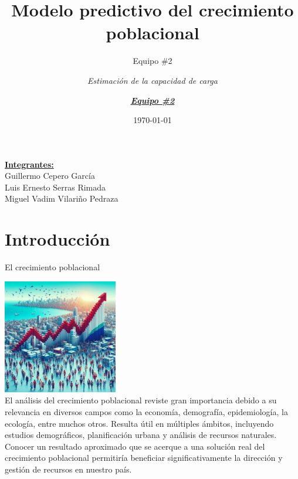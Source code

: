 \documentclass{beamer}
\title{Modelo predictivo del crecimiento poblacional}
\subtitle{Equipo \#2}
\author{\textit{Estimación de la capacidad de carga }}
\date{\today}
\begin{document}

\begin{frame}
    \titlepage 
    \underline{\textbf{Integrantes: }}\\
    Guillermo Cepero García \\ Luis Ernesto Serras Rimada \\ Miguel Vadim Vilariño Pedraza
\end{frame}

\logo{}
\author{\textit{\underline{\textbf{Equipo \#2}}}}

\section{Introducción}
\begin{frame}{El crecimiento poblacional}
    \begin{center}
        \includegraphics[height = 5cm]{img/cuba1.jpeg}
        \\
        \small{El análisis del crecimiento poblacional reviste gran importancia debido a su relevancia en diversos campos como la economía, demografía, epidemiología, la ecología, entre muchos otros. Resulta útil en múltiples ámbitos, incluyendo estudios demográficos, planificación urbana y análisis de recursos naturales. Conocer un resultado aproximado que se
        acerque a una solución real del crecimiento poblacional permitiría beneficiar significativamente la dirección y gestión de recursos en nuestro país.}    
    \end{center}
\end{frame}
\end{document}
